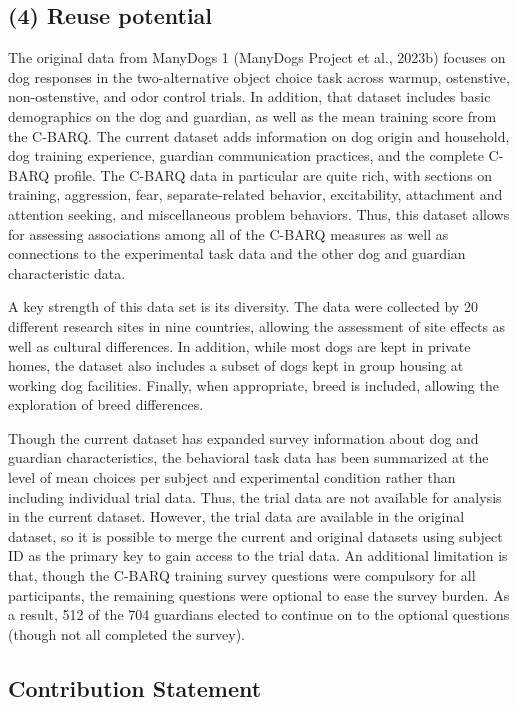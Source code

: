 \documentclass[
  pub,floatsintext]{apa6}
\begin{document}
\hypertarget{reuse-potential}{%
\subsection{(4) Reuse potential}\label{reuse-potential}}

The original data from ManyDogs 1 (ManyDogs Project et al., 2023b) focuses on dog responses in the two-alternative object choice task across warmup, ostenstive, non-ostenstive, and odor control trials. In addition, that dataset includes basic demographics on the dog and guardian, as well as the mean training score from the C-BARQ. The current dataset adds information on dog origin and household, dog training experience, guardian communication practices, and the complete C-BARQ profile. The C-BARQ data in particular are quite rich, with sections on training, aggression, fear, separate-related behavior, excitability, attachment and attention seeking, and miscellaneous problem behaviors. Thus, this dataset allows for assessing associations among all of the C-BARQ measures as well as connections to the experimental task data and the other dog and guardian characteristic data.

A key strength of this data set is its diversity. The data were collected by 20 different research sites in nine countries, allowing the assessment of site effects as well as cultural differences. In addition, while most dogs are kept in private homes, the dataset also includes a subset of dogs kept in group housing at working dog facilities. Finally, when appropriate, breed is included, allowing the exploration of breed differences.

Though the current dataset has expanded survey information about dog and guardian characteristics, the behavioral task data has been summarized at the level of mean choices per subject and experimental condition rather than including individual trial data. Thus, the trial data are not available for analysis in the current dataset. However, the trial data are available in the original dataset, so it is possible to merge the current and original datasets using subject ID as the primary key to gain access to the trial data. An additional limitation is that, though the C-BARQ training survey questions were compulsory for all participants, the remaining questions were optional to ease the survey burden. As a result, 512 of the 704 guardians elected to continue on to the optional questions (though not all completed the survey).

\hypertarget{contribution-statement}{%
\subsection{Contribution Statement}\label{contribution-statement}}
\end{document}
